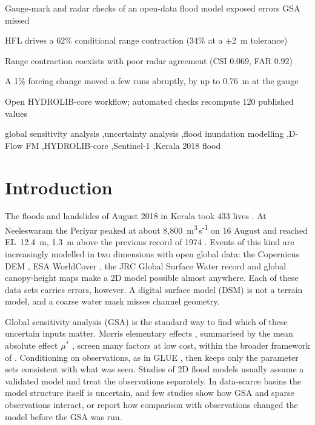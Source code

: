 \documentclass[preprint,12pt,authoryear]{elsarticle}
\newcommand{\cumecs}{m\textsuperscript{3}\,s\textsuperscript{-1}}
\begin{document}
\begin{frontmatter}
\begin{highlights}
\item Gauge-mark and radar checks of an open-data flood model exposed errors GSA missed
\item HFL drives a 62\% conditional range contraction (34\% at a $\pm$2~m tolerance)
\item Range contraction coexists with poor radar agreement (CSI 0.069, FAR 0.92)
\item A 1\% forcing change moved a few runs abruptly, by up to 0.76~m at the gauge
\item Open HYDROLIB-core workflow; automated checks recompute 120 published values
\end{highlights}

\begin{keyword}
global sensitivity analysis \sep uncertainty analysis \sep flood inundation modelling \sep D-Flow FM \sep HYDROLIB-core \sep Sentinel-1 \sep Kerala 2018 flood
\end{keyword}

\end{frontmatter}

\linenumbers

\section{Introduction}
\label{sec:intro}

The floods and landslides of August 2018 in Kerala took 433 lives \citep{pdna2018}. At Neeleswaram the Periyar peaked at about 8,800~\cumecs{} on 16 August and reached EL~12.4~m, 1.3~m above the previous record of 1974 \citep{cwc2018}. Events of this kind are increasingly modelled in two dimensions with open global data: the Copernicus DEM \citep{esa2021}, ESA WorldCover \citep{zanaga2022}, the JRC Global Surface Water record \citep{pekel2016} and global canopy-height maps \citep{tolan2024} make a 2D model possible almost anywhere. Each of these data sets carries errors, however. A digital surface model (DSM) is not a terrain model, and a coarse water mask misses channel geometry.

Global sensitivity analysis (GSA) is the standard way to find which of these uncertain inputs matter. Morris elementary effects \citep{morris1991}, summarised by the mean absolute effect $\mu^*$ \citep{campolongo2007}, screen many factors at low cost, within the broader framework of \citet{saltelli2008}. Conditioning on observations, as in GLUE \citep{beven1992}, then keeps only the parameter sets consistent with what was seen. Studies of 2D flood models usually assume a validated model and treat the observations separately. In data-scarce basins the model structure itself is uncertain, and few studies show how GSA and sparse observations interact, or report how comparison with observations changed the model before the GSA was run.
\end{document}
